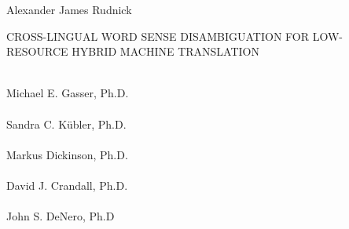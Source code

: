 \documentclass[12pt]{memoir}
\begin{document}

\begin{center}
Alexander James Rudnick
\end{center}

\begin{center}
CROSS-LINGUAL WORD SENSE DISAMBIGUATION FOR LOW-RESOURCE HYBRID MACHINE TRANSLATION
\end{center}

\noindent



\begin{flushright}
\bigskip
\bigskip
\hspace{3in} \hrulefill \\
Michael E. Gasser, Ph.D. \\

\bigskip
\bigskip
\hspace{3in} \hrulefill \\
Sandra C. K\"ubler, Ph.D. \\

\bigskip
\bigskip
\hspace{3in} \hrulefill \\
Markus Dickinson, Ph.D. \\

\bigskip
\bigskip
\hspace{3in} \hrulefill \\
David J. Crandall, Ph.D. \\

\bigskip
\bigskip
\hspace{3in} \hrulefill \\
John S. DeNero, Ph.D
\end{flushright}
\end{document}
